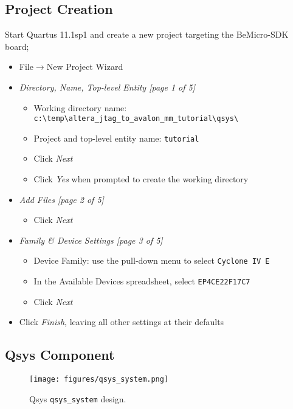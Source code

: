 \documentclass[10pt,twoside]{article}
\begin{document}
\subsection{Project Creation}

Start Quartus 11.1sp1 and create a new project targeting the BeMicro-SDK board;
\begin{itemize}
\item File$\rightarrow$New Project Wizard
\item {\em Directory, Name, Top-level Entity [page 1 of 5]}
\begin{itemize}
\item Working directory name: \verb+c:\temp\altera_jtag_to_avalon_mm_tutorial\qsys\+
\item Project and top-level entity name: \verb+tutorial+
\item Click {\em Next}
\item Click {\em Yes} when prompted to create the working directory
\end{itemize}
%
\item {\em Add Files [page 2 of 5]}
\begin{itemize}
\item Click {\em Next}
\end{itemize}
%
\item {\em Family \& Device Settings [page 3 of 5]}
\begin{itemize}
\item Device Family: use the pull-down menu to select \verb+Cyclone IV E+
\item In the Available Devices spreadsheet, select \verb+EP4CE22F17C7+
\item Click {\em Next}
\end{itemize}
%
\item Click {\em Finish}, leaving all other settings at their defaults
\end{itemize}

\clearpage
\subsection{Qsys Component}

%
\begin{figure}[t]
  \begin{center}
    \texttt{[image: figures/qsys\_system.png]}
  \end{center}
  \caption{Qsys {\tt qsys\_system} design.}
  \label{fig:qsys_system}
\end{figure}
\end{document}
